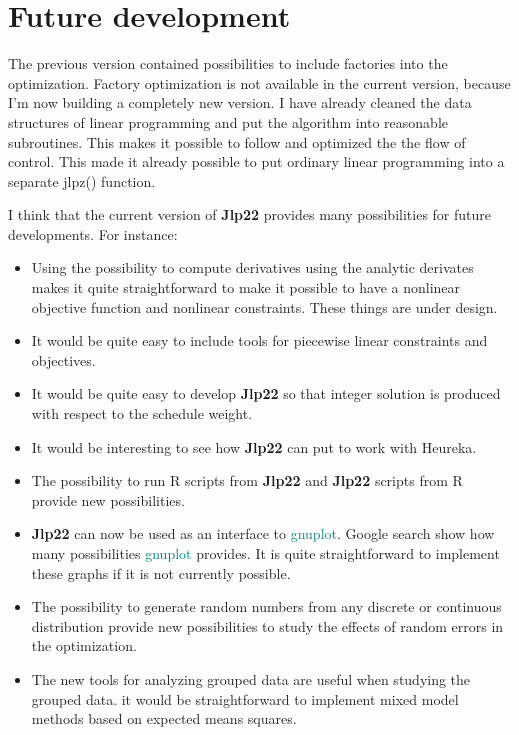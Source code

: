 \section{Future development} 
\label{future} 
The previous version contained possibilities to include factories into the optimization. 
Factory optimization is not available in the current version, because I'm now 
building a completely new version. I have already cleaned the data structures 
of linear programming 
and put the algorithm into reasonable subroutines. This makes it possible to 
follow and optimized the 
the flow of control. This made it already possible to put ordinary linear programming 
into a separate \textcolor{VioletRed}{jlpz}() function. 
 
I think that the current version of \textbf{Jlp22} provides many possibilities for future developments. 
For instance: 
\begin{itemize} 
\itemThe current version does not have any special functions 
for making simulators. The new \textcolor{VioletRed}{goto}() commands, possibility to work with submatrices, 
and the new \textcolor{VioletRed}{transdata}() function provide much more efficient ways to develop simulators. 
Examples will be provided shortly. 
\item Using the possibility to compute derivatives using the analytic derivates makes it quite straightforward 
to make it possible to have a nonlinear objective function and nonlinear constraints. These things 
are under design. 
\item It would be quite easy to include tools for piecewise linear constraints 
and objectives. 
\item It would be quite easy to develop \textbf{Jlp22} so that integer solution is produced with respect to the 
schedule weight. 
\item It would be interesting to see how \textbf{Jlp22} can put to work with Heureka. 
\item The possibility to run R scripts from \textbf{Jlp22} and \textbf{Jlp22} scripts from R provide new possibilities. 
\item \textbf{Jlp22} can now be used as an interface to \textcolor{teal}{gnuplot}. 
Google search show how many possibilities \textcolor{teal}{gnuplot} provides. 
It is quite straightforward to implement these graphs if it is not currently possible. 
\item The possibility to generate random numbers from any discrete or continuous distribution provide new 
possibilities to study the effects of random errors in the optimization. 
\item The new tools for analyzing grouped data are useful when studying the grouped data. it would 
be straightforward to implement mixed model methods based on expected means squares. 
\end{itemize} 
